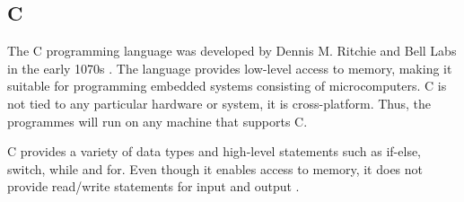 \subsection{C}
The C programming language was developed by Dennis M. Ritchie and Bell Labs in the early 1070s \cite{clanguage}. The language provides low-level access to memory, making it suitable for programming embedded systems consisting of microcomputers. C is not tied to any particular hardware or system, it is cross-platform. Thus, the programmes will run on any machine that supports C.

C provides a variety of data types and high-level statements such as if-else, switch, while and for. Even though it enables access to memory, it does not provide read/write statements for input and output \cite{cproglang}. 
